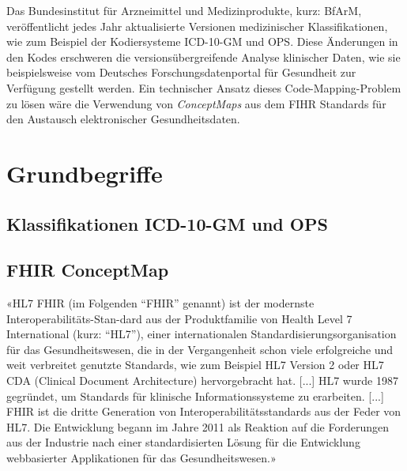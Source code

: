 \begin{comment}
\bibitem{medinf-init}
Medizininformatik-Initiative \newline
\url{https://www.medizininformatik-initiative.de/de/start}

\bibitem{fdpg}
Deutsches Forschungsdatenportal für Gesundheit \newline
\url{https://forschen-fuer-gesundheit.de}
\end{comment}

Das Bundesinstitut für Arzneimittel und Medizinprodukte, kurz: BfArM, veröffentlicht jedes Jahr aktualisierte Versionen medizinischer Klassifikationen, wie zum Beispiel der Kodiersysteme ICD-10-GM und OPS. Diese Änderungen in den Kodes erschweren die versionsübergreifende Analyse klinischer Daten, wie sie beispielsweise vom Deutsches Forschungsdatenportal für Gesundheit \cite{medinf-init} zur Verfügung gestellt werden. Ein technischer Ansatz dieses Code-Mapping-Problem zu lösen wäre die Verwendung von \emph{ConceptMaps} aus dem FIHR Standards für den Austausch elektronischer Gesundheitsdaten.

\section{Grundbegriffe}
\subsection{Klassifikationen ICD-10-GM und OPS}

\cite{gaus2005dokumentation}


\subsection{FHIR ConceptMap}

«HL7\textsuperscript{\textregistered} FHIR\textsuperscript{\textregistered} (im Folgenden "`FHIR"' genannt) ist der modernste Interoperabilitäts-Stan-\newline dard aus der Produktfamilie von Health Level 7 International (kurz: "`HL7"'), einer internationalen Standardisierungsorganisation für das Gesundheitswesen, die in der Vergangenheit schon viele erfolgreiche und weit verbreitet genutzte Standards, wie zum Beispiel HL7 Version 2 oder HL7 CDA (Clinical Document Architecture) hervorgebracht hat. [...] HL7 wurde 1987 gegründet, um Standards für klinische Informationssysteme zu erarbeiten. [...] FHIR ist die dritte Generation von Interoperabilitätsstandards aus der Feder von HL7. Die Entwicklung begann im Jahre 2011 als Reaktion auf die Forderungen aus der Industrie nach einer standardisierten Lösung für die Entwicklung webbasierter Applikationen für das Gesundheitswesen.» \cite{fhir-heckmann}

